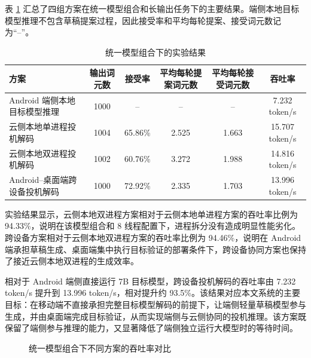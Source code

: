 表 \ref{tab:result-main} 汇总了四组方案在统一模型组合和长输出任务下的主要结果。端侧本地目标模型推理不包含草稿提案过程，因此接受率和平均每轮提案、接受词元数记为“--”。

\begin{table}[htbp]
  \centering
  \caption{统一模型组合下的实验结果}
  \label{tab:result-main}
  \scriptsize
  \setlength{\tabcolsep}{2.5pt}
  \begin{tabularx}{0.99\textwidth}{Xccccc}
    \toprule
    方案 & 输出词元数 & 接受率 & 平均每轮提案词元数 & 平均每轮接受词元数 & 吞吐率 \\
    \midrule
    Android 端侧本地目标模型推理 & 1000 & -- & -- & -- & 7.232 token/s \\
    云侧本地单进程投机解码 & 1004 & 65.86\% & 2.525 & 1.663 & 15.707 token/s \\
    云侧本地双进程投机解码 & 1002 & 60.76\% & 3.272 & 1.988 & 14.816 token/s \\
    Android--桌面端跨设备投机解码 & 1000 & 72.92\% & 2.335 & 1.703 & 13.996 token/s \\
    \bottomrule
  \end{tabularx}
\end{table}

实验结果显示，云侧本地双进程方案相对于云侧本地单进程方案的吞吐率比例为 94.33\%，说明在该模型组合和 8 线程配置下，进程拆分没有造成明显性能劣化。跨设备方案相对于云侧本地双进程方案的吞吐率比例为 94.46\%，说明在 Android 端承担草稿生成、桌面端集中执行目标验证的部署条件下，跨设备协同方案也保持了接近云侧本地双进程的生成效率。

相对于 Android 端侧直接运行 7B 目标模型，跨设备投机解码的吞吐率由 7.232 token/s 提升到 13.996 token/s，相对提升约 93.5\%。该结果对应本文系统的主要目标：在移动端不直接承担完整目标模型解码的前提下，让端侧轻量草稿模型参与生成，并由桌面端完成目标验证，从而实现端侧与云侧协同的投机推理。该方案既保留了端侧参与推理的能力，又显著降低了端侧独立运行大模型时的等待时间。

\begin{figure}[htbp]
  \centering
  \caption{统一模型组合下不同方案的吞吐率对比}
  \label{fig:throughput-compare}
\end{figure}


